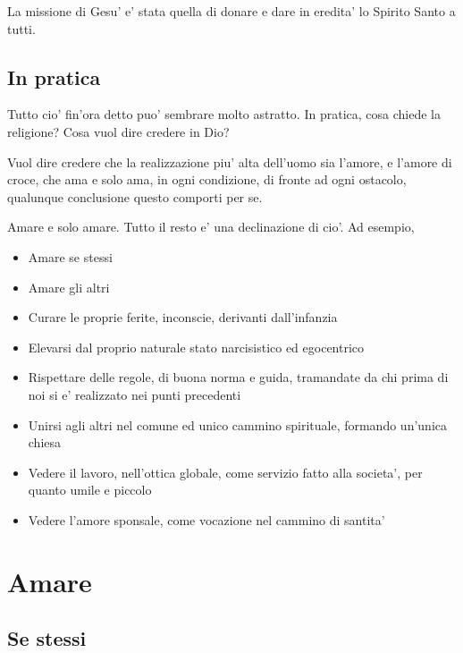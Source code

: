 La missione di Gesu' e' stata quella di donare e dare in eredita' lo Spirito Santo a tutti.

\subsection{In pratica}

Tutto cio' fin'ora detto puo' sembrare molto astratto. In pratica, cosa chiede la religione? Cosa vuol dire credere in Dio?

Vuol dire credere che la realizzazione piu' alta dell'uomo sia l'amore, e l'amore di croce, che ama e solo ama, in ogni condizione, di fronte ad ogni ostacolo, qualunque conclusione questo comporti per se.


Amare e solo amare. Tutto il resto e' una declinazione di cio'. Ad esempio,
\begin{itemize}
    \item Amare se stessi
    \item Amare gli altri
    \item Curare le proprie ferite, inconscie, derivanti dall'infanzia
    \item Elevarsi dal proprio naturale stato narcisistico ed egocentrico
    \item Rispettare delle regole, di buona norma e guida, tramandate da chi prima di noi si e' realizzato nei punti precedenti
    \item Unirsi agli altri nel comune ed unico cammino spirituale, formando un'unica chiesa
    \item Vedere il lavoro, nell'ottica globale, come servizio fatto alla societa', per quanto umile e piccolo
    \item Vedere l'amore sponsale, come vocazione nel cammino di santita'
\end{itemize}


\section{Amare}
\label{amareSe}


\subsection{Se stessi}

